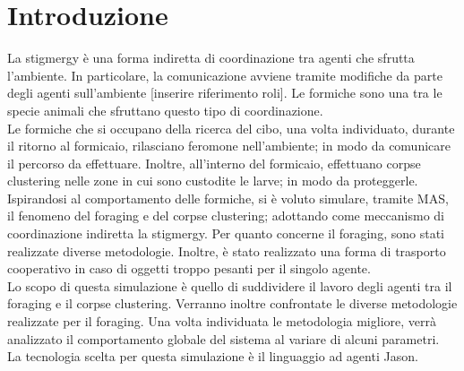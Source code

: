 \documentclass[12pt,a4paper,openright,twoside]{report}
\begin{document}
	\chapter*{Introduzione}                 %

La stigmergy è una forma indiretta di coordinazione tra agenti che sfrutta l'ambiente. In particolare, la comunicazione avviene tramite modifiche da parte degli agenti sull'ambiente [inserire riferimento roli]. Le formiche sono una tra le specie animali che sfruttano questo tipo di coordinazione.\\
Le formiche che si occupano della ricerca del cibo, una volta individuato, durante il ritorno al formicaio, rilasciano feromone nell'ambiente; in modo da comunicare il percorso da effettuare. Inoltre, all'interno del formicaio, effettuano corpse clustering nelle zone in cui sono custodite le larve; in modo da proteggerle.\\
Ispirandosi al comportamento delle formiche, si è voluto simulare, tramite MAS, il fenomeno del foraging e del corpse clustering; adottando come meccanismo di coordinazione indiretta la stigmergy. Per quanto concerne il foraging, sono stati realizzate diverse metodologie. Inoltre, è stato realizzato una forma di trasporto cooperativo in caso di oggetti troppo pesanti per il singolo agente.\\
Lo scopo di questa simulazione è quello di suddividere il lavoro degli agenti tra il foraging e il corpse clustering. Verranno inoltre confrontate le diverse metodologie realizzate per il foraging. Una volta individuata le metodologia migliore, verrà analizzato il comportamento globale del sistema al variare di alcuni parametri.\\
La tecnologia scelta per questa simulazione è il linguaggio ad agenti Jason.
	\clearpage{\pagestyle{empty}\cleardoublepage}
	\tableofcontents                        %
	\rhead[\fancyplain{}{\bfseries\leftmark}]{\fancyplain{}{\bfseries\thepage}}
	\clearpage{\pagestyle{empty}\cleardoublepage}
	\clearpage{\pagestyle{empty}\cleardoublepage}
	\clearpage{\pagestyle{empty}\cleardoublepage}
\end{document}
